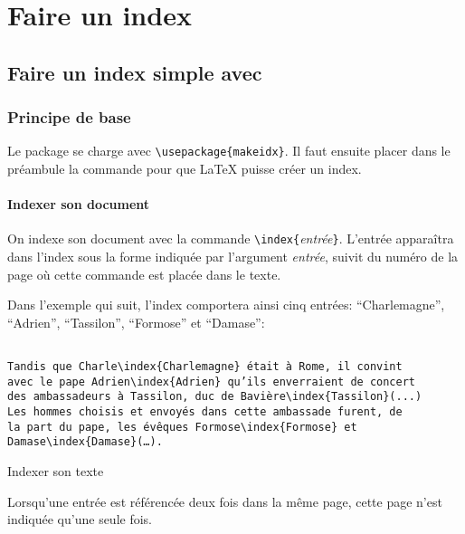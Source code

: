 
\chapter{Faire un index}


\section{Faire un index simple avec }


\subsection{Principe de base}
\begin{prealable}

Le package se charge avec \verb|\usepackage{makeidx}|. Il faut ensuite placer dans le préambule la commande  pour que \LaTeX{}  puisse créer un index.

\end{prealable}



\subsubsection{Indexer son document}


On indexe son document avec  la commande \verb+\index{+\emph{entrée}\verb+}+. L'entrée apparaîtra dans l'index sous la forme indiquée par l'argument \emph{entrée}, suivit du numéro de la page où cette commande est placée dans le texte. 

Dans l'exemple qui suit, l'index comportera ainsi cinq entrées: \enquote{Charlemagne}, \enquote{Adrien}, \enquote{Tassilon}, \enquote{Formose} et \enquote{Damase}:
\begin{listing}[ht]
\begin{verbatim}

Tandis que Charle\index{Charlemagne} était à Rome, il convint
avec le pape Adrien\index{Adrien} qu’ils enverraient de concert
des ambassadeurs à Tassilon, duc de Bavière\index{Tassilon}(...)
Les hommes choisis et envoyés dans cette ambassade furent, de 
la part du pape, les évêques Formose\index{Formose} et 
Damase\index{Damase}(…).

\end{verbatim}
\caption{Indexer son texte}
\end{listing}

 Lorsqu'une entrée est référencée deux fois dans la même page, cette page n'est indiquée qu'une seule fois. 

